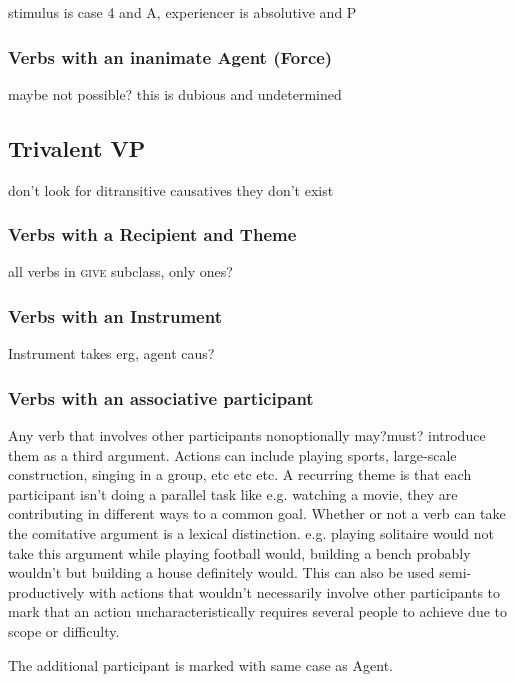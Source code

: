 \documentclass[smallroyalvopaper,9pt]{memoir}
\begin{document}
stimulus is case 4 and A, experiencer is absolutive and P

\subsubsection{Verbs with an inanimate Agent (Force)}

maybe not possible? this is dubious and undetermined

\subsection{Trivalent VP}

don't look for ditransitive causatives they don't exist

\subsubsection{Verbs with a Recipient and Theme}

all verbs in \textsc{give} subclass, only ones?

\subsubsection{Verbs with an Instrument}

Instrument takes erg, agent caus?

\subsubsection{Verbs with an associative participant}

Any verb that involves other participants nonoptionally may?must? introduce them as a third argument. Actions can include playing sports, large-scale construction, singing in a group, etc etc etc. A recurring theme is that each participant isn't doing a parallel task like e.g. watching a movie, they are contributing in different ways to a common goal.
Whether or not a verb can take the comitative argument is a lexical distinction. e.g. playing solitaire would not take this argument while playing football would, building a bench probably wouldn't but building a house definitely would. This can also be used semi-productively with actions that wouldn't necessarily involve other participants to mark that an action uncharacteristically requires several people to achieve due to scope or difficulty.

The additional participant is marked with same case as Agent.
\end{document}
